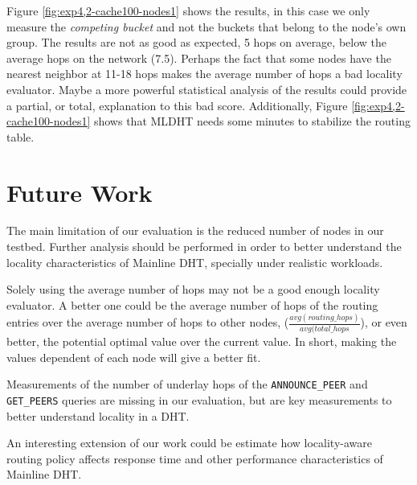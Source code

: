 \documentclass[conference]{IEEEtran}
\begin{document}
Figure \ref{fig:exp4,2-cache100-nodes1} shows the results, in this case we only measure the \textit{competing bucket} and not the buckets that belong to the node's own group. The results are not as good as expected, 5 hops on average, below the average hops on the network (7.5). Perhaps the fact that some nodes have the nearest neighbor at 11-18 hops makes the average number of hops a bad locality evaluator. Maybe a more powerful statistical analysis of the results could provide a partial, or total, explanation to this bad score. Additionally, Figure \ref{fig:exp4,2-cache100-nodes1} shows that MLDHT needs some minutes to stabilize the routing table. 

\section{Future Work}

The main limitation of our evaluation is the reduced number of nodes in our testbed. Further analysis should be performed in order to better understand the locality characteristics of Mainline DHT, specially under realistic workloads.

Solely using the average number of hops may not be a good enough locality evaluator. A better one could be the average number of hops of the routing entries over the average number of hops to other nodes, ($\frac{avg(routing\_hops)}{avg(total\_hops}$), or even better, the potential optimal value over the current value. In short, making the values dependent of each node will give a better fit.

Measurements of the number of underlay hops of the \texttt{ANNOUNCE\_PEER} and \texttt{GET\_PEERS} queries are missing in our evaluation, but are key measurements to better understand locality in a DHT.

An interesting extension of our work could be estimate how locality-aware routing policy affects response time and other performance characteristics of Mainline DHT.



%
%
\end{document}

